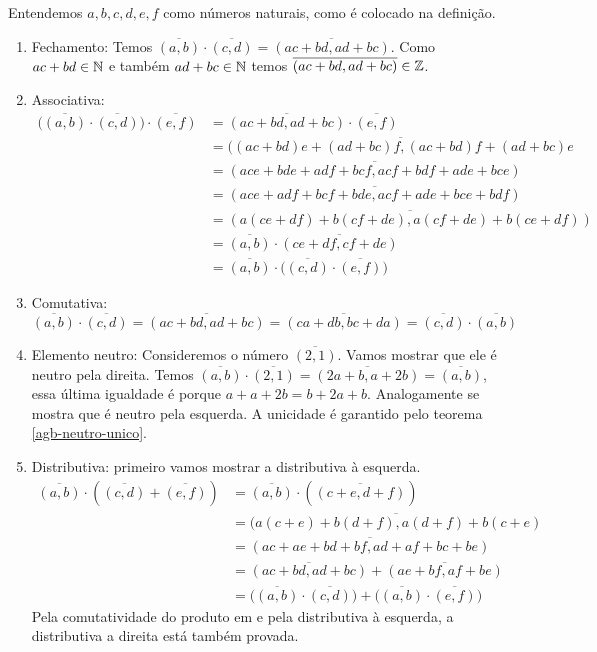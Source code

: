 \documentclass[../main.tex]{subfiles}
\begin{document}
\begin{dem}
    Entendemos $a,b,c,d,e,f$ como números naturais, como é colocado na definição.
    \begin{enumerate}[label=(\roman*)]
        \item Fechamento:
        Temos $\overline{(a,b)} \cdot \overline{(c,d)} = \overline{(ac+bd, ad+bc)}$. Como $ac+bd \in \mathbb{N}$ e também $ad+bc \in \mathbb{N}$ temos $\overline{(ac+bd, ad+bc)} \in \mathbb{Z}$.

        \item Associativa: 
        \begin{align*}
            \big(\overline{(a,b)} \cdot \overline{(c,d)}\big) \cdot  \overline{(e,f)} &= \overline{(ac+bd, ad+bc)} \cdot \overline{(e,f)} \\
            &= \overline{((ac+bd)e + (ad+bc)f , (ac+bd)f + (ad+bc)e} \\
            &= \overline{(ace+bde+adf+bcf, acf+bdf+ade+bce)} \\
            &= \overline{(ace+adf+bcf+bde, acf+ade+bce+bdf)} \\
            &= \overline{(a(ce+df) + b(cf+de) , a(cf+de) + b(ce+df))} \\
            &= \overline{(a,b)} \cdot \overline{(ce+df, cf+de)} \\
            &= \overline{(a,b)} \cdot \big( \overline{(c,d)} \cdot \overline{(e,f)} \big)
        \end{align*}
        
        
        \item Comutativa: 
        $\overline{(a,b)} \cdot \overline{(c,d)} = \overline{(ac+bd, ad+bc)} =
        \overline{(ca+db, bc+da)} = \overline{(c,d)} \cdot \overline{(a,b)}$
            
        
        \item Elemento neutro: Consideremos o número $\overline{(2,1)}$. Vamos mostrar que ele é neutro pela direita. Temos $\overline{(a,b)} \cdot \overline{(2,1)} = \overline{(2a+b, a+2b)} = \overline{(a,b)}$, essa última igualdade é porque $a + a + 2b = b + 2a + b$. Analogamente se mostra que é neutro pela esquerda. A unicidade é garantido pelo teorema \cref{agb-neutro-unico}.
        
        \item Distributiva: primeiro vamos mostrar a distributiva à esquerda.
        \begin{align*}
            \overline{(a,b)} \cdot \left( \overline{(c,d)} + \overline{(e,f)} \right) &= \overline{(a,b)} \cdot (\overline{(c+e,d+f)}) \\
            &= \overline{(a(c+e) + b(d+f), a(d+f) +b(c+e)} \\
            &= \overline{(ac+ae+bd+bf, ad+af+bc+be)} \\
            &= \overline{(ac+bd, ad+bc)} + \overline{(ae+bf, af+be)} \\
            &= \big( \overline{(a,b)} \cdot \overline{(c,d)} \big) + \big( \overline{(a,b)} \cdot \overline{(e,f)} \big)    
        \end{align*}
        Pela comutatividade do produto em \Z e pela distributiva à esquerda, a distributiva a direita está também provada.


\end{enumerate}
\end{dem}
\end{document}
